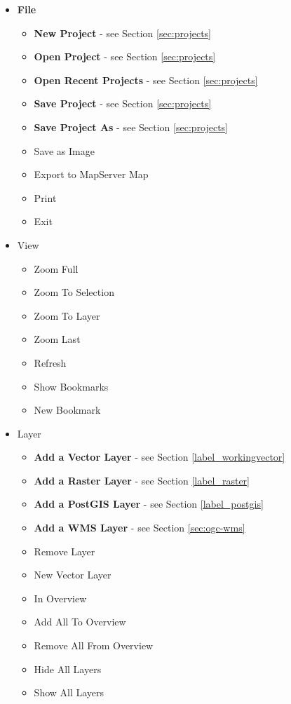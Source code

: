 \begin{itemize}

\item \textbf{File}
\begin{itemize}
\item \textbf{New Project}          - see Section \ref{sec:projects}
\item \textbf{Open Project}         - see Section \ref{sec:projects}
\item \textbf{Open Recent Projects} - see Section \ref{sec:projects}
\item \textbf{Save Project}         - see Section \ref{sec:projects}
\item \textbf{Save Project As}      - see Section \ref{sec:projects}
\item Save as Image
\item Export to MapServer Map
\item Print
\item Exit
\end{itemize}

\item View
\begin{itemize}
\item Zoom Full
\item Zoom To Selection
\item Zoom To Layer
\item Zoom Last
\item Refresh
\item Show Bookmarks
\item New Bookmark
\end{itemize}

\item Layer
\begin{itemize}
\item \textbf{Add a Vector Layer}       - see Section \ref{label_workingvector}
\item \textbf{Add a Raster Layer}       - see Section \ref{label_raster}
\item \textbf{Add a PostGIS Layer}      - see Section \ref{label_postgis}
\item \textbf{Add a WMS Layer}          - see Section \ref{sec:ogc-wms}
\item Remove Layer
\item New Vector Layer
\item In Overview
\item Add All To Overview
\item Remove All From Overview
\item Hide All Layers
\item Show All Layers
\end{itemize}


\end{itemize}

